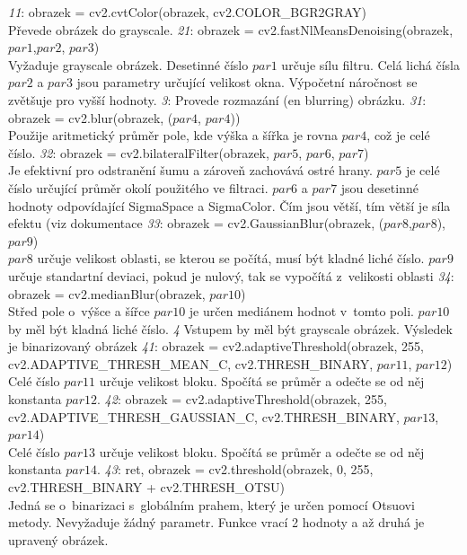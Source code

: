 \documentclass[12pt]{report}			%
\begin{document}
\begin{outline}
\1 \emph{11}: obrazek = cv2.cvtColor(obrazek, cv2.COLOR\_BGR2GRAY)\\ Převede obrázek do grayscale.
\1 \emph{21}: obrazek = cv2.fastNlMeansDenoising(obrazek, $par1$,$par2$, $par3$)\\
Vyžaduje grayscale obrázek. Desetinné číslo $par1$ určuje sílu filtru. Celá lichá čísla $par2$ a $par3$ jsou parametry určující velikost okna. Výpočetní náročnost se zvětšuje pro vyšší hodnoty.
\1 \emph{3}: Provede rozmazání (\gls{en} blurring) obrázku. \parencite{CV_blur}
	\2 \emph{31}: obrazek = cv2.blur(obrazek, ($par4$, $par4$))\\ Použije aritmetický průměr pole, kde výška a šířka je rovna $par4$, což je celé číslo.
	\2 \emph{32}: obrazek = cv2.bilateralFilter(obrazek, $par5$,  $par6$, $par7$)\\
	Je efektivní pro odstranění šumu a zároveň zachovává ostré hrany. $par5$ je celé číslo určující průměr okolí použitého ve filtraci.	 $par6$ a $par7$ jsou desetinné hodnoty odpovídající SigmaSpace a SigmaColor. Čím jsou větší, tím větší je síla efektu (\gls{viz} dokumentace \parencite{CV_bilateral}
	\2 \emph{33}: obrazek = cv2.GaussianBlur(obrazek, ($par8$,$par8$), $par9$)\\  $par8$ určuje velikost oblasti, se kterou se počítá, musí být kladné liché číslo. $par9$ určuje standartní deviaci, pokud je nulový, tak se vypočítá z~velikosti oblasti
	\2 \emph{34}: obrazek = cv2.medianBlur(obrazek, $par10$) \\ Střed pole o~výšce a šířce $par10$ je určen mediánem hodnot v~tomto poli. $par10$ by měl být kladná liché číslo.
\1 \emph{4} Vstupem by měl být grayscale obrázek.  Výsledek je binarizovaný obrázek \parencite{CV_threshold}
	\2 \emph{41}: obrazek = cv2.adaptiveThreshold(obrazek, 255,\\cv2.ADAPTIVE\_THRESH\_MEAN\_C, cv2.THRESH\_BINARY, $par11$, $par12$)\\ Celé číslo $par11$ určuje velikost bloku. Spočítá se průměr a odečte se od něj konstanta $par12$.
	\2 \emph{42}:  obrazek = cv2.adaptiveThreshold(obrazek, 255,\\cv2.ADAPTIVE\_THRESH\_GAUSSIAN\_C, cv2.THRESH\_BINARY, $par13$, $par14$)\\ Celé číslo $par13$ určuje velikost bloku. Spočítá se průměr a odečte se od něj konstanta $par14$.
	\2 \emph{43}: ret, obrazek = cv2.threshold(obrazek, 0, 255, cv2.THRESH\_BINARY + cv2.THRESH\_OTSU)\\
	Jedná se o~binarizaci s~globálním prahem, který je určen pomocí Otsuovi metody. Nevyžaduje žádný parametr. Funkce vrací 2 hodnoty a až druhá je upravený obrázek.
\end{outline}
\end{document}
